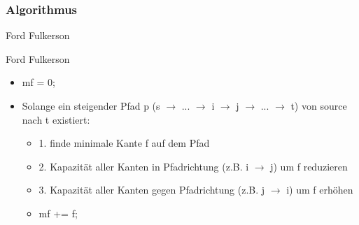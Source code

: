 \subsubsection{Algorithmus}
\begin{frame}{Ford Fulkerson}
  \begin{block}{Ford Fulkerson}
    \begin{itemize}
      \item mf = 0;
      \pause
      \item Solange ein steigender Pfad p (s $\rightarrow$ ...  $\rightarrow$ i $\rightarrow$ j $\rightarrow$ ... $\rightarrow$ t) von source nach t existiert:
      \pause
      \begin{itemize}
      \item 1. finde minimale Kante f auf dem Pfad
      \pause
      \item 2. Kapazität aller Kanten in Pfadrichtung (z.B. i $\rightarrow$ j) um f reduzieren
      \pause
      \item 3. Kapazität aller Kanten gegen Pfadrichtung (z.B. j $\rightarrow$ i) um f erhöhen 
      \pause
      \item mf += f;
      \end{itemize}
    \end{itemize}
  \end{block}
\end{frame}
